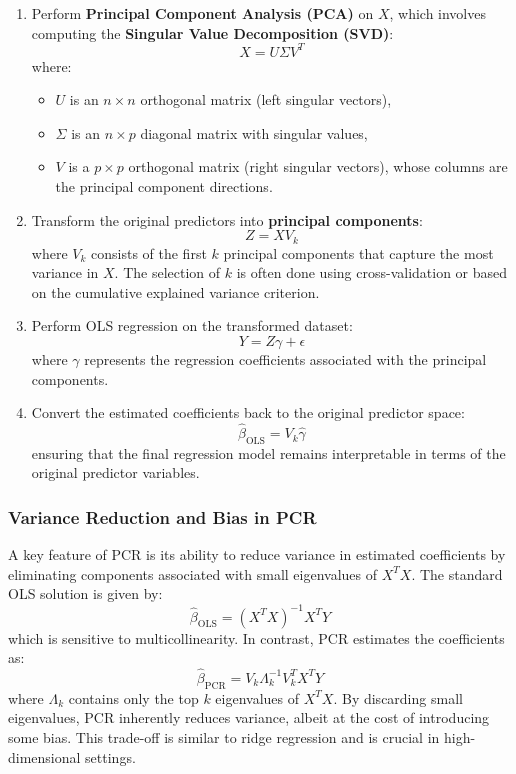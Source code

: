 \documentclass[11pt,twoside,a4paper]{article}
\begin{document}
\begin{enumerate}
    \item Perform \textbf{Principal Component Analysis (PCA)} on \( X \), which involves computing the \textbf{Singular Value Decomposition (SVD)}:
    \[
    X = U \Sigma V^T
    \]
    where:
    \begin{itemize}
        \item \( U \) is an \( n \times n \) orthogonal matrix (left singular vectors),
        \item \( \Sigma \) is an \( n \times p \) diagonal matrix with singular values,
        \item \( V \) is a \( p \times p \) orthogonal matrix (right singular vectors), whose columns are the principal component directions.
    \end{itemize}
    
    \item Transform the original predictors into \textbf{principal components}:
    \[
    Z = X V_k
    \]
    where \( V_k \) consists of the first \( k \) principal components that capture the most variance in \( X \). The selection of \( k \) is often done using cross-validation or based on the cumulative explained variance criterion.

    \item Perform OLS regression on the transformed dataset:
    \[
    Y = Z \gamma + \epsilon
    \]
    where \( \gamma \) represents the regression coefficients associated with the principal components.

    \item Convert the estimated coefficients back to the original predictor space:
    \[
    \hat{\beta}_{\text{OLS}} = V_k \hat{\gamma}
    \]
    ensuring that the final regression model remains interpretable in terms of the original predictor variables.
\end{enumerate}

\subsubsection{Variance Reduction and Bias in PCR}
A key feature of PCR is its ability to reduce variance in estimated coefficients by eliminating components associated with small eigenvalues of \( X^T X \). The standard OLS solution is given by:
\[
\hat{\beta}_{\text{OLS}} = (X^T X)^{-1} X^T Y
\]
which is sensitive to multicollinearity. In contrast, PCR estimates the coefficients as:
\[
\hat{\beta}_{\text{PCR}} = V_k \Lambda_k^{-1} V_k^T X^T Y
\]
where \( \Lambda_k \) contains only the top \( k \) eigenvalues of \( X^T X \). By discarding small eigenvalues, PCR inherently reduces variance, albeit at the cost of introducing some bias. This trade-off is similar to ridge regression and is crucial in high-dimensional settings.
\end{document}
